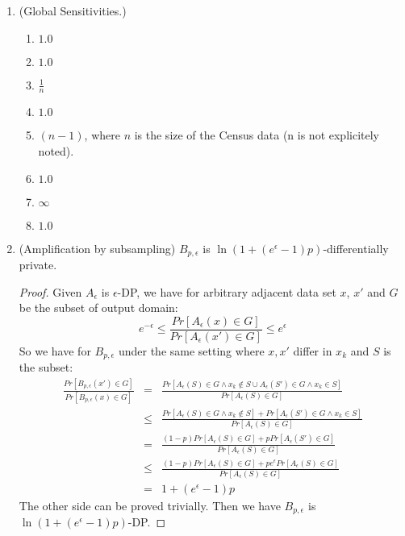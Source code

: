 \documentclass[11pt]{article}
\begin{document}
\begin{enumerate}
\item (Global Sensitivities.)
\begin{enumerate}
	\item $1.0$
	\item $1.0$
	\item $\frac{1}{n}$
	\item $1.0$
	\item $(n - 1)$, where $n$ is the size of the Census data (n is not explicitely noted).
	\item $1.0$
	\item $\infty$
	\item $1.0$
\end{enumerate}
\item (Amplification by subsampling)
$B_{p, \epsilon}$ is $\ln(1 + (e^{\epsilon} - 1)p)$-differentially private.
\begin{proof}
Given $A_{\epsilon}$ is $\epsilon$-DP, we have for arbitrary adjacent data set $x$, $x'$ and $G$ be the subset of output domain:
\[
	e^{-\epsilon} \leq 
	\frac{Pr[A_{\epsilon}(x) \in G]}{Pr[A_{\epsilon}(x') \in G]} 
	\leq e^{\epsilon}
\]
So we have for $B_{p, \epsilon}$ under the same setting where $x, x'$ differ in $x_k$ and $S$ is the subset:
\[
\begin{array}{ccc}
	\frac{Pr[B_{p, \epsilon}(x') \in G]}
	{Pr[B_{p, \epsilon}(x) \in G]}
	& = & 
	\frac{Pr[A_{\epsilon}(S) \in G \land x_k \notin S  
	\cup A_{\epsilon}(S') \in G \land x_k \in S]}
	{Pr[A_{\epsilon}(S) \in G]}
	\\
	& \leq &
	\frac{Pr[A_{\epsilon}(S) \in G \land x_k \notin S]
	+ Pr[A_{\epsilon}(S') \in G \land x_k \in S]}
	{Pr[A_{\epsilon}(S) \in G]}
	\\
	& = &
	\frac{(1 - p)Pr[A_{\epsilon}(S) \in G]
	+ p Pr[A_{\epsilon}(S') \in G]}
	{Pr[A_{\epsilon}(S) \in G]}
	\\
	& \leq &
	\frac{(1 - p)Pr[A_{\epsilon}(S) \in G]
	+ p e^{\epsilon}Pr[A_{\epsilon}(S) \in G]}
	{Pr[A_{\epsilon}(S) \in G]}
	\\
	& = & 1 + (e^{\epsilon} - 1)p
\end{array}
\]
The other side can be proved trivially. Then we have $B_{p, \epsilon}$ is $\ln(1 + (e^{\epsilon} - 1)p)$-DP.


\end{proof}
\end{enumerate}
\end{document}
